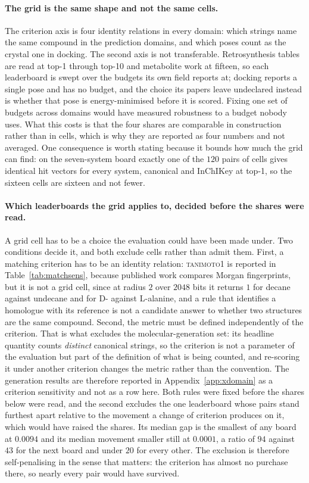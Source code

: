 \paragraph{The grid is the same shape and not the same cells.} The criterion axis is four identity
relations in every domain: which strings name the same compound in the prediction domains, and which
poses count as the crystal one in docking. The second axis is not transferable. Retrosynthesis
tables are read at top-1 through top-10 and metabolite work at fifteen, so each leaderboard is swept
over the budgets its own field reports at; docking reports a single pose and has no budget, and the
choice its papers leave undeclared instead is whether that pose is energy-minimised before it is
scored. Fixing one set of budgets across domains would have measured robustness to a budget nobody
uses. What this costs is that the four shares are comparable in construction rather than in cells,
which is why they are reported as four numbers and not averaged.
One consequence is worth stating because it bounds how much the grid can find: on the seven-system
board exactly one of the $120$ pairs of cells gives identical hit vectors for every system,
canonical and InChIKey at top-1, so the sixteen cells are sixteen and not fewer.

\paragraph{Which leaderboards the grid applies to, decided before the shares were read.} A grid
cell has to be a choice the evaluation could have been made under. Two conditions decide it, and
both exclude cells rather than admit them. First, a matching criterion has to be an identity
relation: \textsc{tanimoto1} is reported in Table~\ref{tab:matchsens}, because published work
compares Morgan fingerprints, but it is not a grid cell, since at radius $2$ over $2048$ bits it
returns $1$ for decane against undecane and for D- against L-alanine, and a rule that identifies a
homologue with its reference is not a candidate answer to whether two structures are the same
compound. Second, the metric must be defined independently of the criterion. That is what excludes
the molecular-generation set: its headline quantity counts \emph{distinct} canonical strings, so the
criterion is not a parameter of the evaluation but part of the definition of what is being counted,
and re-scoring it under another criterion changes the metric rather than the convention. The
generation results are therefore reported in Appendix~\ref{app:xdomain} as a criterion sensitivity
and not as a row here. Both rules were fixed before the shares below were read, and the second
excludes the one leaderboard whose pairs stand furthest apart relative to the movement a change of
criterion produces on it, which would have raised the shares. Its median gap is the smallest of
any board at $0.0094$ and its median movement smaller still at $0.0001$, a ratio of $94$ against
$43$ for the next board and under $20$ for every other. The exclusion is therefore self-penalising
in the sense that matters: the criterion has almost no purchase there, so nearly every pair would
have survived.


